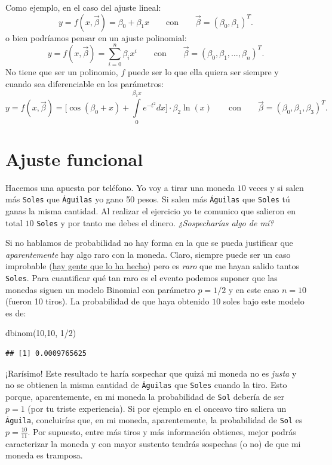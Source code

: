 \documentclass[
]{book}
\newenvironment{Shaded}{\begin{snugshade}}{\end{snugshade}}
\newcommand{\DecValTok}[1]{\textcolor[rgb]{0.00,0.00,0.81}{#1}}
\newcommand{\FunctionTok}[1]{\textcolor[rgb]{0.00,0.00,0.00}{#1}}
\newcommand{\NormalTok}[1]{#1}
\newcommand{\SpecialCharTok}[1]{\textcolor[rgb]{0.00,0.00,0.00}{#1}}
\begin{document}
Como ejemplo, en el caso del ajuste lineal:
\[
y = f(x, \vec{\beta}) = \beta_0 + \beta_1 x \qquad \text{con} \qquad \vec{\beta}= (\beta_0,\beta_1)^T.
\]
o bien podríamos pensar en un ajuste polinomial:
\[
y = f(x, \vec{\beta}) = \sum\limits_{i = 0}^n \beta_i x^i \qquad \text{con} \qquad \vec{\beta}= (\beta_0,\beta_1, \dots, \beta_n)^T.
\]
No tiene que ser un polinomio, \(f\) puede ser lo que ella quiera ser siempre y cuando sea diferenciable en los parámetros:
\[
y = f(x, \vec{\beta}) = \Bigg[\cos(\beta_0 + x) + \int\limits_{0}^{\beta_1 x} e^{-t^2} dx \Bigg] \cdot \beta_2 \ln(x) \qquad \text{con} \qquad \vec{\beta}= (\beta_0,\beta_1, \beta_3)^T.
\]

\hypertarget{ajuste-funcional}{%
\section{Ajuste funcional}\label{ajuste-funcional}}

Hacemos una apuesta por teléfono. Yo voy a tirar una moneda \(10\) veces y si salen más \texttt{Soles} que \texttt{Águilas} yo gano 50 pesos. Si salen más \texttt{Águilas} que \texttt{Soles} tú ganas la misma cantidad. Al realizar el ejercicio yo te comunico que salieron en total \(10\) \texttt{Soles} y por tanto me debes el dinero. \emph{¿Sospecharías algo de mí?}

Si no hablamos de probabilidad no hay forma en la que se pueda justificar que \emph{aparentemente} hay algo raro con la moneda. Claro, siempre puede ser un caso improbable (\href{https://www.youtube.com/watch?v=rwvIGNXY21Y}{hay gente que lo ha hecho}) pero es \emph{raro} que me hayan salido tantos \texttt{Soles}. Para cuantificar qué tan raro es el evento podemos suponer que las monedas siguen un modelo Binomial con parámetro \(p = 1/2\) y en este caso \(n = 10\) (fueron 10 tiros). La probabilidad de que haya obtenido \(10\) soles bajo este modelo es de:

\begin{Shaded}
\begin{Highlighting}[]
\FunctionTok{dbinom}\NormalTok{(}\DecValTok{10}\NormalTok{,}\DecValTok{10}\NormalTok{, }\DecValTok{1}\SpecialCharTok{/}\DecValTok{2}\NormalTok{)}
\end{Highlighting}
\end{Shaded}

\begin{verbatim}
## [1] 0.0009765625
\end{verbatim}

¡Rarísimo! Este resultado te haría sospechar que quizá mi moneda no es \emph{justa} y no se obtienen la misma cantidad de \texttt{Águilas} que \texttt{Soles} cuando la tiro. Esto porque, aparentemente, en mi moneda la probabilidad de \texttt{Sol} debería de ser \(p = 1\) (por tu triste experiencia). Si por ejemplo en el onceavo tiro saliera un \texttt{Águila}, concluirías que, en mi moneda, aparentemente, la probabilidad de \texttt{Sol} es \(p = \frac{10}{11}\). Por supuesto, entre más tiros y más información obtienes, mejor podrás caracterizar la moneda y con mayor sustento tendrás sospechas (o no) de que mi moneda es tramposa.
\end{document}
